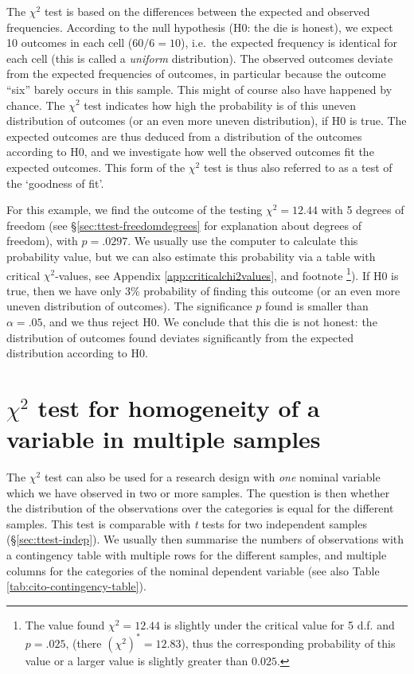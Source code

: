 \documentclass[
]{book}
\begin{document}
The \(\chi^2\) test is based on the differences between the expected
and observed frequencies. According to the null hypothesis (H0: the die is honest),
we expect 10 outcomes in each cell (\(60/6=10\)), i.e.~the
expected frequency is identical for each cell (this is called
a \emph{uniform} distribution).
The observed outcomes deviate from the expected frequencies of outcomes,
in particular because the outcome ``six'' barely occurs in this sample. This
might of course also have happened by chance. The \(\chi^2\) test indicates how high the probability is of this uneven distribution of outcomes (or an even more uneven distribution),
if H0 is true.
The expected outcomes are thus deduced from a distribution of the outcomes
according to H0, and we investigate how well the observed outcomes
fit the expected outcomes. This form of the \(\chi^2\) test is thus also
referred to as a test of the `goodness of fit'.

For this example, we find the outcome of the testing \(\chi^2=12.44\)
with 5 degrees of freedom (see
§\ref{sec:ttest-freedomdegrees} for explanation about
degrees of freedom), with \(p=.0297\). We usually use the computer to
calculate this probability value, but we can also estimate this probability
via a table with critical
\(\chi^2\)-values, see Appendix \ref{app:criticalchi2values}, and footnote
\footnote{The value found \(\chi^2=12.44\) is slightly under the critical value for
  5 d.f. and \(p=.025\), (there \((\chi^2)^*=12.83\)), thus the corresponding probability
  of this value or a larger value is slightly greater than \(0.025\).}).
If H0 is true, then we have only 3\% probability
of finding this outcome (or an even more uneven distribution of outcomes).
The significance \(p\) found is smaller than \(\alpha=.05\), and we thus
reject H0. We conclude that this die is not honest: the distribution
of outcomes found deviates significantly from the expected
distribution according to H0.

\hypertarget{chi2-test-for-homogeneity-of-a-variable-in-multiple-samples}{%
\section{\texorpdfstring{\(\chi^2\) test for homogeneity of a variable in multiple samples}{\textbackslash chi\^{}2 test for homogeneity of a variable in multiple samples}}\label{chi2-test-for-homogeneity-of-a-variable-in-multiple-samples}}

The \(\chi^2\) test can also be used for a research design with \emph{one} nominal
variable which we have observed in two or more samples. The
question is then whether the distribution of the observations over the
categories is equal for the different samples. This test is comparable with
\emph{t} tests for two independent samples
(§\ref{sec:ttest-indep}). We usually then summarise the numbers of observations
with a contingency table with multiple rows for the different samples,
and multiple columns for the categories of the nominal dependent variable (see also
Table \ref{tab:cito-contingency-table}).
\end{document}
